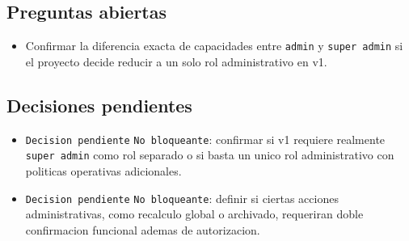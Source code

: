 \subsection{Preguntas abiertas}

\begin{itemize}
  \item Confirmar la diferencia exacta de capacidades entre \texttt{admin} y \texttt{super admin} si el proyecto decide reducir a un solo rol administrativo en v1.
\end{itemize}

\subsection{Decisiones pendientes}

\begin{itemize}
  \item \texttt{Decision pendiente} \texttt{No bloqueante}: confirmar si v1 requiere realmente \texttt{super admin} como rol separado o si basta un unico rol administrativo con politicas operativas adicionales.
  \item \texttt{Decision pendiente} \texttt{No bloqueante}: definir si ciertas acciones administrativas, como recalculo global o archivado, requeriran doble confirmacion funcional ademas de autorizacion.
\end{itemize}
